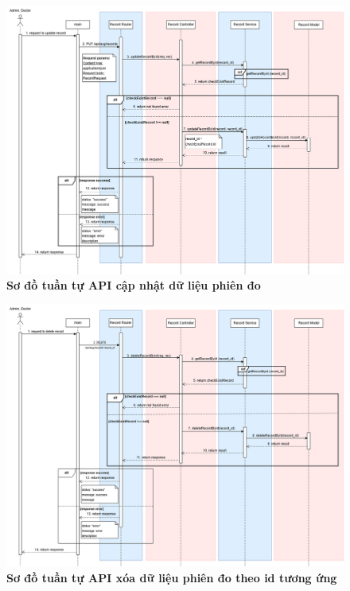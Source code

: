 \begin{figure}[H]
	\centering
	\includegraphics[width=16cm]{Images/api_sequence/record/updateRecordById.drawio.png}
	\caption[Sơ đồ tuần tự API cập nhật dữ liệu phiên đo]{\bfseries \fontsize{12pt}{0pt}\selectfont Sơ đồ tuần tự API cập nhật dữ liệu phiên đo}
	\label{sequence_diagram_update_record}
\end{figure}

\begin{figure}[H]
	\centering
	\includegraphics[width=16cm]{Images/api_sequence/record/deleteRecordByID.drawio.png}
	\caption[Sơ đồ tuần tự API xóa dữ liệu phiên đo theo id tương ứng]{\bfseries \fontsize{12pt}{0pt}\selectfont Sơ đồ tuần tự API xóa dữ liệu phiên đo theo id tương ứng}
	\label{sequence_diagram_delete_record}
\end{figure}

